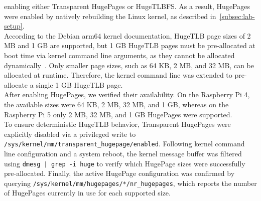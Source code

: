        enabling either Transparent HugePages or HugeTLBFS. As a result, HugePages were enabled by 
        natively rebuilding the Linux kernel, as described in~\cref{subsec:lab-setup}.
        \\
        According to the Debian arm64 kernel documentation, HugeTLB page sizes of 2 MB and 1 GB are 
        supported, but 1 GB HugeTLB pages must be pre-allocated at boot time via kernel command line 
        arguments, as they cannot be allocated dynamically~\cite{webHugepagesDebian}. Only smaller page sizes, such as 
        64 KB, 2 MB, and 32 MB, can be allocated at runtime. Therefore, the kernel command line was 
        extended to pre-allocate a single 1 GB HugeTLB page.
        \\
        After enabling HugePages, we verified their availability. On the 
        Raspberry Pi 4, the available sizes were 64 KB, 2 MB, 32 MB, and 1 GB, whereas on the 
        Raspberry Pi 5 only 2 MB, 32 MB, and 1 GB HugePages were supported. \\
        To ensure deterministic 
        HugeTLB behavior, Transparent HugePages were explicitly disabled via a privileged write to 
        \texttt{/sys/kernel/mm/transparent\_hugepage/enabled}. Following kernel command line 
        configuration and a system reboot, the kernel message buffer was filtered using 
        \texttt{dmesg | grep -i huge} to verify which HugePage sizes were successfully pre-allocated. 
        Finally, the active HugePage configuration was confirmed by querying 
        \texttt{/sys/kernel/mm/hugepages/*/nr\_hugepages}, which reports the number of HugePages 
        currently in use for each supported size.
    
